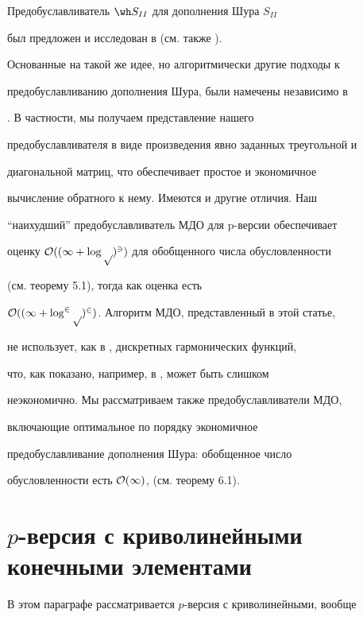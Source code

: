 \begin{notes}


Предобуславливатель $\s$ для дополнения Шура $S_{II}$


был предложен и исследован в \cite{iva-kor3} (см. также \cite{iva-kor4}).


Основанные на такой же идее, но алгоритмически другие подходы к


предобуславливанию дополнения Шура, были намечены независимо в


\cite{ainsworth}. В частности, мы получаем представление нашего


предобуславливателя в виде произведения явно заданных треугольной и


диагональной матриц, что обеспечивает простое и экономичное


вычисление обратного к нему. Имеются и другие отличия. Наш


``наихудший'' предобуславливатель МДО для p-версии обеспечивает


оценку $\cal O((1+\log p)^3)$ для обобщенного числа обусловленности


(см. теорему 5.1), тогда как оценка \cite{ainsworth} есть


$\cal O((1+\log^2p)^2)$. Алгоритм МДО, представленный в этой статье,


не использует, как в \cite{ainsworth}, дискретных гармонических функций,


что, как показано, например, в \cite{mandel2}, может быть слишком


неэкономично. Мы рассматриваем также предобуславливатели МДО,


включающие оптимальное по порядку экономичное


предобуславливание дополнения Шура: обобщенное число


обусловленности есть $\cal O(1)$, (см. теорему 6.1).


\end{notes}





\section{$p$-версия с криволинейными конечными элементами}





В этом параграфе рассматривается $p$-версия с криволинейными, вообще



